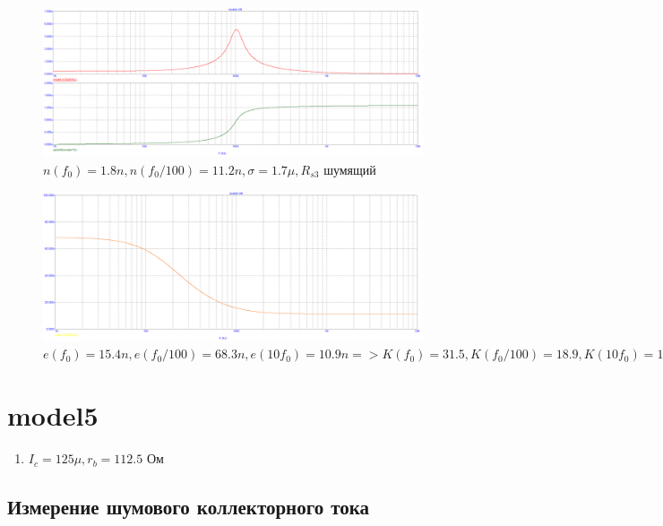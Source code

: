 \documentclass[a4paper, 12pt]{article}%
\begin{document}
\begin{enumerate}
\begin{figure}[h!]
    \centering
    \includegraphics[scale=0.3]{images/mod4_3_2_3.png}
    \caption{$n(f_0) = 1.8n, n(f_0/100) = 11.2n, \sigma = 1.7\mu, R_{s3}$ шумящий}
    \label{fig:m4322}
\end{figure}

\begin{figure}[h!]
    \centering
    \includegraphics[scale=0.3]{images/mod4_3_3.png}
    \caption{$e(f_0) = 15.4n, e(f_0/100) = 68.3n, e(10 f_0) = 10.9n => K(f_0) = 31.5, K(f_0/100) = 18.9, K(10 f_0) = 15.8$}
    \label{fig:m433}
\end{figure}
\FloatBarrier


\end{enumerate}

\section{\textbf{model5}}

\begin{enumerate}

\item

\FloatBarrier
$I_c = 125\mu, r_b = 112.5$ Ом


\end{enumerate}

\subsection*{Измерение шумового коллекторного тока}
\end{document}
